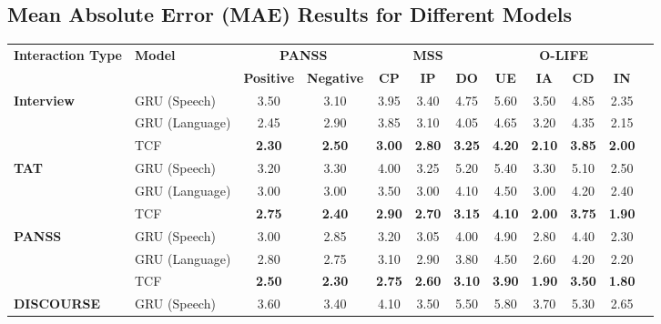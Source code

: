 \documentclass[9pt,a4paper]{rho-class/rho}
\begin{document}
\subsection{Mean Absolute Error (MAE) Results for Different Models}


\begin{table*}[htbp]
\centering
{}  %
\begin{tabularx}{\textwidth}{>{\raggedright\arraybackslash}X | l | c | c | c | c | c | c | c | c | c | c }
\toprule
\textbf{Interaction Type} & \textbf{Model} & \multicolumn{2}{c}{\textbf{PANSS}} & \multicolumn{3}{c}{\textbf{MSS}} & \multicolumn{4}{c}{\textbf{O-LIFE}} \\
                          &                & \textbf{Positive} & \textbf{Negative} & \textbf{CP} & \textbf{IP} & \textbf{DO} & \textbf{UE} & \textbf{IA} & \textbf{CD} & \textbf{IN} \\
\midrule
\textbf{Interview} & GRU (Speech)     & 3.50 & 3.10 & 3.95 & 3.40 & 4.75 & 5.60 & 3.50 & 4.85 & 2.35 \\
                      & GRU (Language)   & 2.45 & 2.90 & 3.85 & 3.10 & 4.05 & 4.65 & 3.20 & 4.35 & 2.15 \\
                      & TCF       & \textbf{2.30} & \textbf{2.50} & \textbf{3.00} & \textbf{2.80} & \textbf{3.25} & \textbf{4.20} & \textbf{2.10} & \textbf{3.85} & \textbf{2.00} \\
\midrule
\textbf{TAT} & GRU (Speech)     & 3.20 & 3.30 & 4.00 & 3.25 & 5.20 & 5.40 & 3.30 & 5.10 & 2.50 \\
                          & GRU (Language)   & 3.00 & 3.00 & 3.50 & 3.00 & 4.10 & 4.50 & 3.00 & 4.20 & 2.40 \\
                          & TCF       & \textbf{2.75} & \textbf{2.40} & \textbf{2.90} & \textbf{2.70} & \textbf{3.15} & \textbf{4.10} & \textbf{2.00} & \textbf{3.75} & \textbf{1.90} \\
\midrule
\textbf{PANSS} & GRU (Speech)     & 3.00 & 2.85 & 3.20 & 3.05 & 4.00 & 4.90 & 2.80 & 4.40 & 2.30 \\
               & GRU (Language)   & 2.80 & 2.75 & 3.10 & 2.90 & 3.80 & 4.50 & 2.60 & 4.20 & 2.20 \\
               & TCF       & \textbf{2.50} & \textbf{2.30} & \textbf{2.75} & \textbf{2.60} & \textbf{3.10} & \textbf{3.90} & \textbf{1.90} & \textbf{3.50} & \textbf{1.80} \\
\midrule
\textbf{DISCOURSE} & GRU (Speech)     & 3.60 & 3.40 & 4.10 & 3.50 & 5.50 & 5.80 & 3.70 & 5.30 & 2.65 \\

\end{tabularx}
\end{table*}
\end{document}
